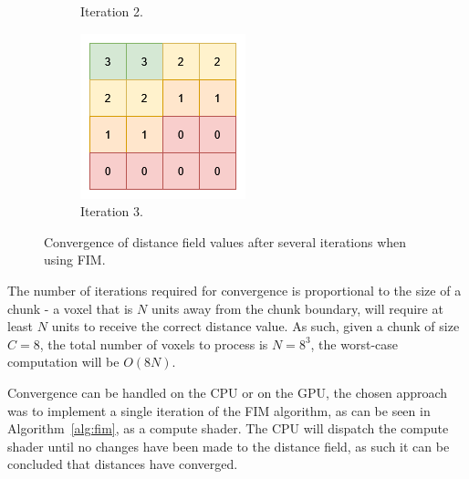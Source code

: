 \begin{figure}[htbp]
\begin{subfigure}[t]{0.24\textwidth}
        \caption{Iteration 2.}
    \end{subfigure}
    \hfill
    \begin{subfigure}[t]{0.24\textwidth}
        \centering
        \includegraphics[width=\textwidth]{figures/voxel_grid_fmm_3.drawio.png}
        \caption{Iteration 3.}
    \end{subfigure}
    \caption{Convergence of distance field values after several iterations when using FIM.}
    \label{fig:fim_convergence}
\end{figure}

The number of iterations required for convergence is proportional to the size of a chunk - a voxel that is \(N\) units
away from the chunk boundary, will require at least \(N\) units to receive the correct distance value. As such, given a
chunk of size \(C = 8\), the total number of voxels to process is \(N = 8^3\), the worst-case computation will be
\(O(8N)\).

Convergence can be handled on the CPU or on the GPU, the chosen approach was to implement a single iteration of the FIM
algorithm, as can be seen in Algorithm~\ref{alg:fim}, as a compute shader. The CPU will dispatch the compute shader
until no changes have been made to the distance field, as such it can be concluded that distances have converged.

